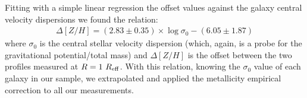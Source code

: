 	Fitting with a simple linear regression the offset values against the galaxy central velocity dispersions we 
	found the relation:
	\begin{eqnarray}
	 \Delta\left[ Z/H\right] =  \left(2.83 \pm 0.35\right) \times \log{\sigma_{0}} - \left(6.05 \pm 1.87 \right)
	\end{eqnarray}
	where $\sigma_{0}$ is the central stellar velocity dispersion (which, again, is a probe for the gravitational potential/total mass) 
	and $\Delta\left[ Z/H\right]$ is the offset between the two profiles measured at $R = 1~R_{\rm{eff}}$. 
	With this relation, knowing the $\sigma_0$ value of each galaxy in our sample, we extrapolated and applied the metallicity 
	empirical correction to all our measurements. 
	
